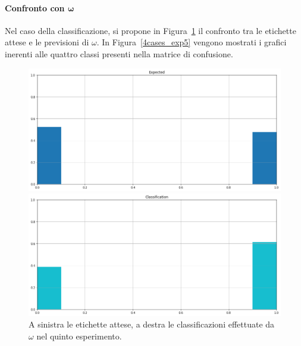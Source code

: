 \documentclass[12pt]{report}
\theoremstyle{definition}
\begin{document}
\paragraph{Confronto con $\bm{\omega}$}
Nel caso della classificazione, si propone in Figura~\ref{classification_exp5} il confronto tra le etichette attese e le previsioni di $\omega$. 
In Figura~\ref{4cases_exp5} vengono mostrati i grafici inerenti alle quattro classi presenti nella matrice di confusione.
\begin{figure}
\centering
    \begin{minipage}{0.48\textwidth}
        \includegraphics[width=\linewidth]{images/experiment_beta5_sovrapposti/expected_classification.png}
    \end{minipage}
    \begin{minipage}{0.48\textwidth}
        \includegraphics[width=\linewidth]{images/experiment_beta5_sovrapposti/prediction_classification.png}
    \end{minipage}
    \caption{A sinistra le etichette attese, a destra le classificazioni effettuate da $\omega$ nel quinto esperimento.}
    \label{classification_exp5}
\end{figure}
\end{document}
